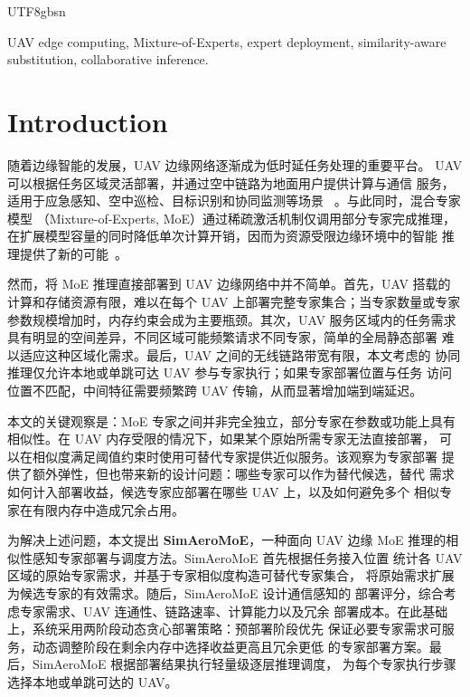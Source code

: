 \documentclass[conference]{IEEEtran}
\begin{document}
\begin{CJK*}{UTF8}{gbsn}
\begin{IEEEkeywords}
UAV edge computing, Mixture-of-Experts, expert deployment,
similarity-aware substitution, collaborative inference.
\end{IEEEkeywords}

\IEEEpeerreviewmaketitle

\section{Introduction}
\label{sec:intro}

随着边缘智能的发展，UAV 边缘网络逐渐成为低时延任务处理的重要平台。
UAV 可以根据任务区域灵活部署，并通过空中链路为地面用户提供计算与通信
服务，适用于应急感知、空中巡检、目标识别和协同监测等场景
~\cite{mozaffari2019uav,zhu2019uav}。与此同时，混合专家模型
（Mixture-of-Experts, MoE）通过稀疏激活机制仅调用部分专家完成推理，
在扩展模型容量的同时降低单次计算开销，因而为资源受限边缘环境中的智能
推理提供了新的可能~\cite{shazeer2017moe,fedus2022switch,jiang2024mixtral}。

然而，将 MoE 推理直接部署到 UAV 边缘网络中并不简单。首先，UAV 搭载的
计算和存储资源有限，难以在每个 UAV 上部署完整专家集合；当专家数量或专家
参数规模增加时，内存约束会成为主要瓶颈。其次，UAV 服务区域内的任务需求
具有明显的空间差异，不同区域可能频繁请求不同专家，简单的全局静态部署
难以适应这种区域化需求。最后，UAV 之间的无线链路带宽有限，本文考虑的
协同推理仅允许本地或单跳可达 UAV 参与专家执行；如果专家部署位置与任务
访问位置不匹配，中间特征需要频繁跨 UAV 传输，从而显著增加端到端延迟。

本文的关键观察是：MoE 专家之间并非完全独立，部分专家在参数或功能上具有
相似性。在 UAV 内存受限的情况下，如果某个原始所需专家无法直接部署，
可以在相似度满足阈值约束时使用可替代专家提供近似服务。该观察为专家部署
提供了额外弹性，但也带来新的设计问题：哪些专家可以作为替代候选，替代
需求如何计入部署收益，候选专家应部署在哪些 UAV 上，以及如何避免多个
相似专家在有限内存中造成冗余占用。

为解决上述问题，本文提出 \textbf{SimAeroMoE}，一种面向 UAV 边缘 MoE
推理的相似性感知专家部署与调度方法。SimAeroMoE 首先根据任务接入位置
统计各 UAV 区域的原始专家需求，并基于专家相似度构造可替代专家集合，
将原始需求扩展为候选专家的有效需求。随后，SimAeroMoE 设计通信感知的
部署评分，综合考虑专家需求、UAV 连通性、链路速率、计算能力以及冗余
部署成本。在此基础上，系统采用两阶段动态贪心部署策略：预部署阶段优先
保证必要专家需求可服务，动态调整阶段在剩余内存中选择收益更高且冗余更低
的专家部署方案。最后，SimAeroMoE 根据部署结果执行轻量级逐层推理调度，
为每个专家执行步骤选择本地或单跳可达的 UAV。


\end{CJK*}
\end{document}
